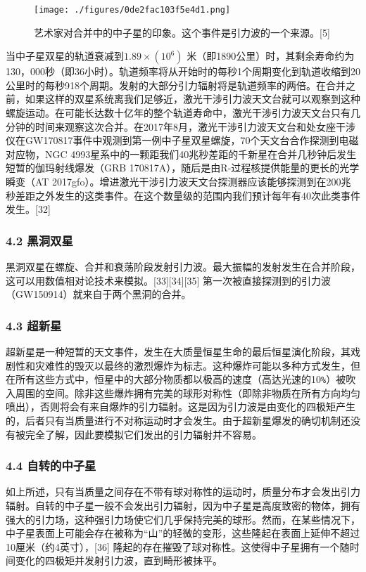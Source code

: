 \begin{figure}[ht]
\centering
\texttt{[image: ./figures/0de2fac103f5e4d1.png]}
\caption{艺术家对合并中的中子星的印象。这个事件是引力波的一个来源。[5]} \label{fig_YLB_7}
\end{figure}

当中子星双星的轨道衰减到$1.89\times(10^6)$ 米（即1890公里）时，其剩余寿命约为130，000秒（即36小时）。轨道频率将从开始时的每秒1个周期变化到轨道收缩到20公里时的每秒918个周期。发射的大部分引力辐射将是轨道频率的两倍。在合并之前，如果这样的双星系统离我们足够近，激光干涉引力波天文台就可以观察到这种螺旋运动。在可能长达数十亿年的整个轨道寿命中，激光干涉引力波天文台只有几分钟的时间来观察这次合并。在2017年8月，激光干涉引力波天文台和处女座干涉仪在GW170817事件中观测到第一例中子星双星螺旋，70个天文台合作探测到电磁对应物，NGC 4993星系中的一颗距我们40兆秒差距的千新星在合并几秒钟后发生短暂的伽玛射线爆发（GRB 170817A），随后是由R-过程核提供能量的更长的光学瞬变（AT 2017gfo）。增进激光干涉引力波天文台探测器应该能够探测到在200兆秒差距之外发生的这类事件。在这个数量级的范围内我们预计每年有40次此类事件发生。[32]
\subsubsection{4.2 黑洞双星}

黑洞双星在螺旋、合并和衰荡阶段发射引力波。最大振幅的发射发生在合并阶段，这可以用数值相对论技术来模拟。[33][34][35] 第一次被直接探测到的引力波（GW150914）就来自于两个黑洞的合并。

\subsubsection{4.3 超新星}

超新星是一种短暂的天文事件，发生在大质量恒星生命的最后恒星演化阶段，其戏剧性和灾难性的毁灭以最终的激烈爆炸为标志。这种爆炸可能以多种方式发生，但在所有这些方式中，恒星中的大部分物质都以极高的速度（高达光速的10\verb`%`）被吹入周围的空间。除非这些爆炸拥有完美的球形对称性（即除非物质在所有方向均匀喷出），否则将会有来自爆炸的引力辐射。这是因为引力波是由变化的四极矩产生的，后者只有当质量进行不对称运动时才会发生。由于超新星爆发的确切机制还没有被完全了解，因此要模拟它们发出的引力辐射并不容易。

\subsubsection{4.4 自转的中子星}

如上所述，只有当质量之间存在不带有球对称性的运动时，质量分布才会发出引力辐射。自转的中子星一般不会发出引力辐射，因为中子星是高度致密的物体，拥有强大的引力场，这种强引力场使它们几乎保持完美的球形。然而，在某些情况下，中子星表面上可能会存在被称为“山”的轻微的变形，这些隆起在表面上延伸不超过10厘米（约4英寸），[36] 隆起的存在摧毁了球对称性。这使得中子星拥有一个随时间变化的四极矩并发射引力波，直到畸形被抹平。

